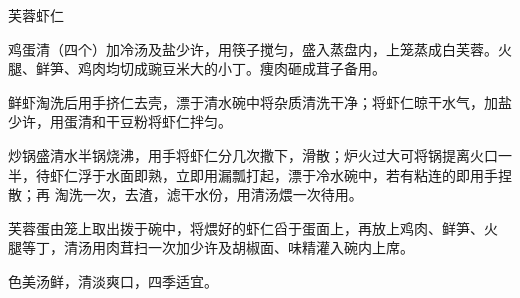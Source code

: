 %
%
%
%
%
%
%
\begin{recipe}{芙蓉虾仁}

\ingredients


\preparation

\step 鸡蛋清（四个）加冷汤及盐少许，用筷子搅匀，盛入蒸盘内，上笼蒸成白芙蓉。火
腿、鲜笋、鸡肉均切成豌豆米大的小丁。痩肉砸成茸子备用。

\step 鲜虾淘洗后用手挤仁去壳，漂于清水碗中将杂质清洗干净；将虾仁晾干水气，加盐
少许，用蛋清和干豆粉将虾仁拌匀。

\step 炒锅盛清水半锅烧沸，用手将虾仁分几次撒下，滑散；炉火过大可将锅提离火口一
半，待虾仁浮于水面即熟，立即用漏瓢打起，漂于冷水碗中，若有粘连的即用手捏散；再
淘洗一次，去渣，滤干水份，用清汤煨一次待用。

\step 芙蓉蛋由笼上取出拨于碗中，将煨好的虾仁舀于蛋面上，再放上鸡肉、鲜笋、火
腿等丁，清汤用肉茸扫一次加少许及胡椒面、味精灌入碗内上席。

\features

色美汤鲜，清淡爽口，四季适宜。

\end{recipe}

